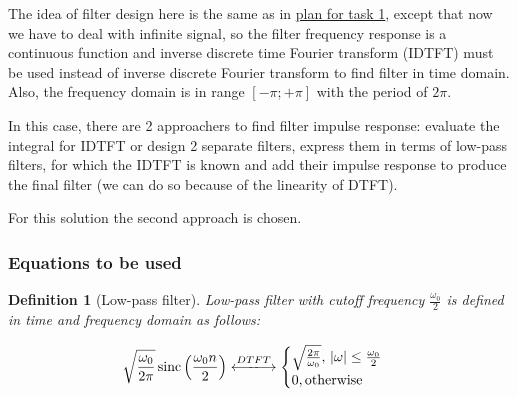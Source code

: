 \documentclass[a4paper]{article}
\theoremstyle{break}
\newtheorem{definition}{Definition}[section]
\theoremstyle{break}
\DeclarePairedDelimiter\abs{\lvert}{\rvert}
\DeclareMathOperator{\sinc}{sinc}
\begin{document}
The idea of filter design here is the same as in \hyperref[subsub:task_1_plan]{plan for task 1}, except that now we have to deal with infinite signal, so the filter frequency response is a continuous function and inverse discrete time Fourier transform (IDTFT) must be used instead of inverse discrete Fourier transform to find filter in time domain. Also, the frequency domain is in range $\left[ -\pi; + \pi \right]$ with the period of $2 \pi$.

In this case, there are 2 approachers to find filter impulse response: evaluate the integral for IDTFT or design 2 separate filters, express them in terms of low-pass filters, for which the IDTFT is known and add their impulse response to produce the final filter (we can do so because of the linearity of DTFT).

For this solution the second approach is chosen.

\subsubsection*{Equations to be used}



\begin{definition}[Low-pass filter] \label{def:low_pass}
  Low-pass filter with \textit{cutoff} frequency $\frac{\omega_0}{2}$ is defined in time and frequency domain as follows:

  \begin{equation} \label{eq:low_pass}
    \sqrt{\frac{\omega_0}{2 \pi}} \sinc \left( \frac{\omega_0 n} {2} \right)
    \xlongleftrightarrow{DTFT}
    \begin{cases}
      \sqrt{\frac{2 \pi}{\omega_0}}, \, \abs{\omega} \leq \frac{\omega_0}{2} \\
      0, \text{otherwise}
    \end{cases}
  \end{equation}
\end{definition}
\end{document}
